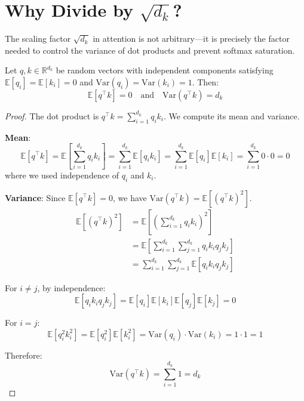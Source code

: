 \section{Why Divide by $\sqrt{d_k}$?}

The scaling factor $\sqrt{d_k}$ in attention is not arbitrary---it is precisely the factor needed to control the variance of dot products and prevent softmax saturation.

\begin{theorem}
    Let $q, k \in \mathbb{R}^{d_k}$ be random vectors with independent components satisfying $\mathbb{E}[q_i] = \mathbb{E}[k_i] = 0$ and $\text{Var}(q_i) = \text{Var}(k_i) = 1$. Then:
    \[
        \mathbb{E}[q^\top k] = 0 \quad \text{and} \quad \text{Var}(q^\top k) = d_k
    \]
\end{theorem}

\begin{proof}
    The dot product is $q^\top k = \sum_{i=1}^{d_k} q_i k_i$. We compute its mean and variance.

    \textbf{Mean}:
    \[
        \mathbb{E}[q^\top k] = \mathbb{E}\left[\sum_{i=1}^{d_k} q_i k_i\right] = \sum_{i=1}^{d_k} \mathbb{E}[q_i k_i] = \sum_{i=1}^{d_k} \mathbb{E}[q_i] \mathbb{E}[k_i] = \sum_{i=1}^{d_k} 0 \cdot 0 = 0
    \]
    where we used independence of $q_i$ and $k_i$.

    \textbf{Variance}: Since $\mathbb{E}[q^\top k] = 0$, we have $\text{Var}(q^\top k) = \mathbb{E}[(q^\top k)^2]$.
    \begin{align*}
        \mathbb{E}[(q^\top k)^2] &= \mathbb{E}\left[\left(\sum_{i=1}^{d_k} q_i k_i\right)^2\right] \\
        &= \mathbb{E}\left[\sum_{i=1}^{d_k} \sum_{j=1}^{d_k} q_i k_i q_j k_j\right] \\
        &= \sum_{i=1}^{d_k} \sum_{j=1}^{d_k} \mathbb{E}[q_i k_i q_j k_j]
    \end{align*}

    For $i \neq j$, by independence:
    \[
        \mathbb{E}[q_i k_i q_j k_j] = \mathbb{E}[q_i]\mathbb{E}[k_i]\mathbb{E}[q_j]\mathbb{E}[k_j] = 0
    \]

    For $i = j$:
    \[
        \mathbb{E}[q_i^2 k_i^2] = \mathbb{E}[q_i^2] \mathbb{E}[k_i^2] = \text{Var}(q_i) \cdot \text{Var}(k_i) = 1 \cdot 1 = 1
    \]

    Therefore:
    \[
        \text{Var}(q^\top k) = \sum_{i=1}^{d_k} 1 = d_k
    \]
\end{proof}

